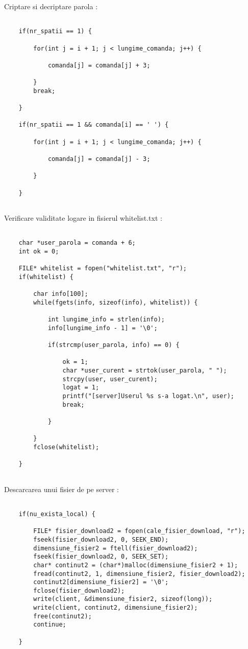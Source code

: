 \documentclass[runningheads]{llncs}
\begin{document}
Criptare si decriptare parola :

\begin{verbatim}

    if(nr_spatii == 1) {

        for(int j = i + 1; j < lungime_comanda; j++) {

            comanda[j] = comanda[j] + 3;

        }
        break;

    }

    if(nr_spatii == 1 && comanda[i] == ' ') {

        for(int j = i + 1; j < lungime_comanda; j++) {

            comanda[j] = comanda[j] - 3;

        }

    }    
    
\end{verbatim}

Verificare validitate logare in fisierul whitelist.txt : 

\begin{verbatim}

    char *user_parola = comanda + 6;
    int ok = 0;

    FILE* whitelist = fopen("whitelist.txt", "r");
    if(whitelist) {

        char info[100];
        while(fgets(info, sizeof(info), whitelist)) {

            int lungime_info = strlen(info);
            info[lungime_info - 1] = '\0';

            if(strcmp(user_parola, info) == 0) {

                ok = 1;     
                char *user_curent = strtok(user_parola, " ");
                strcpy(user, user_curent);
                logat = 1;
                printf("[server]Userul %s s-a logat.\n", user);
                break;                        

            }

        }
        fclose(whitelist);

    }
    
\end{verbatim}

Descarcarea unui fisier de pe server : 

\begin{verbatim}

    if(nu_exista_local) {

        FILE* fisier_download2 = fopen(cale_fisier_download, "r");
        fseek(fisier_download2, 0, SEEK_END);
        dimensiune_fisier2 = ftell(fisier_download2);
        fseek(fisier_download2, 0, SEEK_SET);
        char* continut2 = (char*)malloc(dimensiune_fisier2 + 1);
        fread(continut2, 1, dimensiune_fisier2, fisier_download2);
        continut2[dimensiune_fisier2] = '\0';
        fclose(fisier_download2); 
        write(client, &dimensiune_fisier2, sizeof(long));
        write(client, continut2, dimensiune_fisier2);
        free(continut2);
        continue;

    }
    
\end{verbatim}
\end{document}
